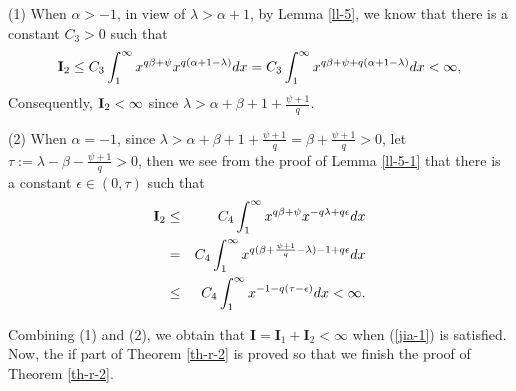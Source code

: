 \documentclass[10pt]{amsart}
\theoremstyle{definition}    %
\numberwithin{equation}{section}
\begin{document}
(1) When $\alpha>-1$, in view of $\lambda>\alpha+1$, by Lemma \ref{ll-5}, we know that there is a constant $C_3>0$ such that
$${\bf I}_2\leq C_3 \int_{1}^{\infty}x^{q\beta+\psi}x^{q(\alpha+1-\lambda)}dx=C_3\int_{1}^{\infty}x^{q\beta+\psi+q(\alpha+1-\lambda)}dx<\infty,$$
Consequently, ${\bf I}_2<\infty$ since $\lambda>\alpha+\beta+1+\frac{\psi+1}{q}$. 

(2) When $\alpha=-1$, since $\lambda>\alpha+\beta+1+\frac{\psi+1}{q}=\beta+\frac{\psi+1}{q}>0$, let $\tau:=\lambda-\beta-\frac{\psi+1}{q}>0$, then we see from the proof of Lemma \ref{ll-5-1} that there is a constant $\epsilon\in (0,\tau)$ such that
\begin{eqnarray}{\bf I}_2&\leq& C_4 \int_{1}^{\infty}x^{q\beta+\psi}x^{-q\lambda+q\epsilon}dx\nonumber \\
&=&C_4\int_{1}^{\infty}x^{q(\beta+\frac{\psi+1}{q}-\lambda)-1+q\epsilon}dx \nonumber \\
&\leq & C_4 \int_{1}^{\infty}x^{-1-q(\tau-\epsilon)}dx<\infty.\nonumber\end{eqnarray}

Combining (1) and (2), we obtain that $\mathbf{I}=\mathbf{I}_1+\mathbf{I}_2<\infty$ when (\ref{jia-1}) is satisfied. Now, the if part of Theorem \ref{th-r-2} is proved so that we finish the proof of Theorem \ref{th-r-2}. 
\end{document}
